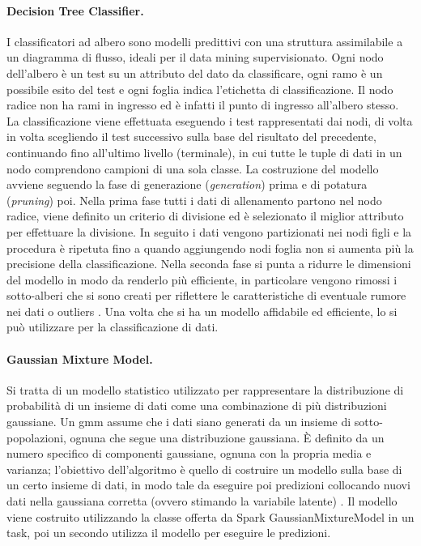\documentclass[12pt,a4paper,fleqn,titlepage]{report}
\begin{document}
        \paragraph{Decision Tree Classifier.}
        I classificatori ad albero sono modelli predittivi con una struttura assimilabile a un diagramma di flusso, ideali per il data mining supervisionato. Ogni nodo dell'albero è un test su un attributo del dato da classificare, ogni ramo è un possibile esito del test e ogni foglia indica l'etichetta di classificazione. Il nodo radice non ha rami in ingresso ed è infatti il punto di ingresso all'albero stesso. La classificazione viene effettuata eseguendo i test rappresentati dai nodi, di volta in volta scegliendo il test successivo sulla base del risultato del precedente, continuando fino all'ultimo livello (terminale), in cui tutte le tuple di dati in un nodo comprendono campioni di una sola classe.
        La costruzione del modello avviene seguendo la fase di generazione (\textit{generation}) prima e di potatura (\textit{pruning}) poi. Nella prima fase tutti i dati di allenamento partono nel nodo radice, viene definito un criterio di divisione ed è selezionato il miglior attributo per effettuare la divisione. In seguito i dati vengono partizionati nei nodi figli e la procedura è ripetuta fino a quando aggiungendo nodi foglia non si aumenta più la precisione della classificazione. Nella seconda fase si punta a ridurre le dimensioni del modello in modo da renderlo più efficiente, in particolare vengono rimossi i sotto-alberi che si sono creati per riflettere le caratteristiche di eventuale rumore nei dati o outliers \cite{priyanka:2020}.
        Una volta che si ha un modello affidabile ed efficiente, lo si può utilizzare per la classificazione di dati.

        \paragraph{Gaussian Mixture Model.}
        Si tratta di un modello statistico utilizzato per rappresentare la distribuzione di probabilità di un insieme di dati come una combinazione di più distribuzioni gaussiane. Un \gls{gmm} assume che i dati siano generati da un insieme di sotto-popolazioni, ognuna che segue una distribuzione gaussiana. È definito da un numero specifico di componenti gaussiane, ognuna con la propria media e varianza; l'obiettivo dell'algoritmo è quello di costruire un modello sulla base di un certo insieme di dati, in modo tale da eseguire poi predizioni collocando nuovi dati nella gaussiana corretta (ovvero stimando la variabile latente) \cite{reynolds:2015}.
        Il modello viene costruito utilizzando la classe offerta da Spark GaussianMixtureModel in un task, poi un secondo utilizza il modello per eseguire le predizioni.
\end{document}
